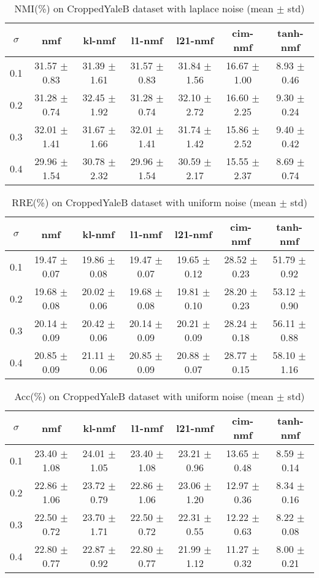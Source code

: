 \documentclass{article} %
\begin{document}
\begin{table}
\begin{tabular}{c|cccccc}$\sigma$ & nmf & kl-nmf & l1-nmf & l21-nmf & cim-nmf & tanh-nmf \\\hline
0.1 & 31.57 $\pm$ 0.83 & 31.39 $\pm$ 1.61 & 31.57 $\pm$ 0.83 & 31.84 $\pm$ 1.56 & 16.67 $\pm$ 1.00 & 8.93 $\pm$ 0.46 \\
0.2 & 31.28 $\pm$ 0.74 & 32.45 $\pm$ 1.92 & 31.28 $\pm$ 0.74 & 32.10 $\pm$ 2.72 & 16.60 $\pm$ 2.25 & 9.30 $\pm$ 0.24 \\
0.3 & 32.01 $\pm$ 1.41 & 31.67 $\pm$ 1.66 & 32.01 $\pm$ 1.41 & 31.74 $\pm$ 1.42 & 15.86 $\pm$ 2.52 & 9.40 $\pm$ 0.42 \\
0.4 & 29.96 $\pm$ 1.54 & 30.78 $\pm$ 2.32 & 29.96 $\pm$ 1.54 & 30.59 $\pm$ 2.17 & 15.55 $\pm$ 2.37 & 8.69 $\pm$ 0.74 \\
\end{tabular}\caption{
  NMI(\%) on CroppedYaleB dataset with laplace noise (mean $\pm$ std)
  \label{tab:NMI-CroppedYaleB-laplace}
}\end{table}
\begin{table}
\begin{tabular}{c|cccccc}$\sigma$ & nmf & kl-nmf & l1-nmf & l21-nmf & cim-nmf & tanh-nmf \\\hline
0.1 & 19.47 $\pm$ 0.07 & 19.86 $\pm$ 0.08 & 19.47 $\pm$ 0.07 & 19.65 $\pm$ 0.12 & 28.52 $\pm$ 0.23 & 51.79 $\pm$ 0.92 \\
0.2 & 19.68 $\pm$ 0.08 & 20.02 $\pm$ 0.06 & 19.68 $\pm$ 0.08 & 19.81 $\pm$ 0.10 & 28.20 $\pm$ 0.23 & 53.12 $\pm$ 0.90 \\
0.3 & 20.14 $\pm$ 0.09 & 20.42 $\pm$ 0.06 & 20.14 $\pm$ 0.09 & 20.21 $\pm$ 0.09 & 28.24 $\pm$ 0.18 & 56.11 $\pm$ 0.88 \\
0.4 & 20.85 $\pm$ 0.09 & 21.11 $\pm$ 0.06 & 20.85 $\pm$ 0.09 & 20.88 $\pm$ 0.07 & 28.77 $\pm$ 0.15 & 58.10 $\pm$ 1.16 \\
\end{tabular}\caption{
  RRE(\%) on CroppedYaleB dataset with uniform noise (mean $\pm$ std)
  \label{tab:RRE-CroppedYaleB-uniform}
}\end{table}
\begin{table}
\begin{tabular}{c|cccccc}$\sigma$ & nmf & kl-nmf & l1-nmf & l21-nmf & cim-nmf & tanh-nmf \\\hline
0.1 & 23.40 $\pm$ 1.08 & 24.01 $\pm$ 1.05 & 23.40 $\pm$ 1.08 & 23.21 $\pm$ 0.96 & 13.65 $\pm$ 0.48 & 8.59 $\pm$ 0.14 \\
0.2 & 22.86 $\pm$ 1.06 & 23.72 $\pm$ 0.79 & 22.86 $\pm$ 1.06 & 23.06 $\pm$ 1.20 & 12.97 $\pm$ 0.36 & 8.34 $\pm$ 0.16 \\
0.3 & 22.50 $\pm$ 0.72 & 23.70 $\pm$ 1.71 & 22.50 $\pm$ 0.72 & 22.31 $\pm$ 0.55 & 12.22 $\pm$ 0.63 & 8.22 $\pm$ 0.08 \\
0.4 & 22.80 $\pm$ 0.77 & 22.87 $\pm$ 0.92 & 22.80 $\pm$ 0.77 & 21.99 $\pm$ 1.12 & 11.27 $\pm$ 0.32 & 8.00 $\pm$ 0.21 \\
\end{tabular}\caption{
  Acc(\%) on CroppedYaleB dataset with uniform noise (mean $\pm$ std)
  \label{tab:Acc-CroppedYaleB-uniform}
}\end{table}
\end{document}
